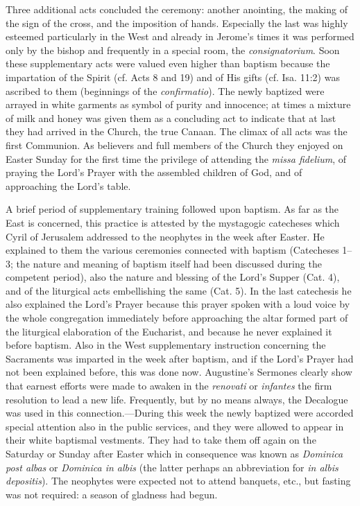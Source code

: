Three additional acts concluded the ceremony: another anointing, the making of the sign of the cross, and the
imposition of hands. Especially the last was highly esteemed particularly in the West and already in Jerome’s times it was performed only by the bishop and frequently in a special room, the \emph{consignatorium}. Soon these supplementary acts were valued even higher than baptism because the impartation of the Spirit (cf. Acts 8 and 19) and of His gifts (cf. Isa. 11:2) was ascribed to them (beginnings of the \emph{confirmatio}). The newly baptized were arrayed in white garments as symbol of purity and innocence; at times a mixture of milk and honey was given them as a concluding act to indicate that at last they had arrived in the Church, the true Canaan. The climax of all acts was the first Communion. As believers and full members of the Church they enjoyed on Easter Sunday for the first time the privilege of attending the \emph{missa fidelium}, of praying the Lord’s Prayer with the assembled children of God, and of approaching the Lord’s table.

A brief period of supplementary training followed upon baptism. As far as the East is concerned, this practice is attested by the mystagogic catecheses which Cyril of Jerusalem addressed to the neophytes in the week after Easter. He explained to them the various ceremonies connected with baptism (Catecheses 1–3; the nature and meaning of baptism itself had been discussed during the competent period), also the nature and blessing of the Lord’s Supper (Cat. 4), and of the liturgical acts embellishing the same (Cat. 5). In the last catechesis he also explained the Lord’s Prayer because this prayer spoken with a loud voice by the whole congregation immediately before approaching the altar formed part of the liturgical elaboration of the Eucharist, and because he never explained it before baptism. Also in the West supplementary instruction concerning the Sacraments was imparted in the week after baptism, and if the Lord’s Prayer had not been explained before, this was done now. Augustine’s Sermones clearly show that earnest efforts were made to awaken
in the \emph{renovati} or \emph{infantes} the firm resolution to lead a new life. Frequently, but by no means always, the Decalogue was used in this connection.—During this week the newly baptized were accorded special attention also in the public services, and they were allowed to appear in their white baptismal vestments. They had to take them off again on the Saturday or Sunday after Easter which in consequence was known as \emph{Dominica post albas} or \emph{Dominica in albis} (the latter perhaps an abbreviation for \emph{in albis depositis}). The neophytes were expected not to attend banquets, etc., but fasting was not required: a season of gladness had begun.

